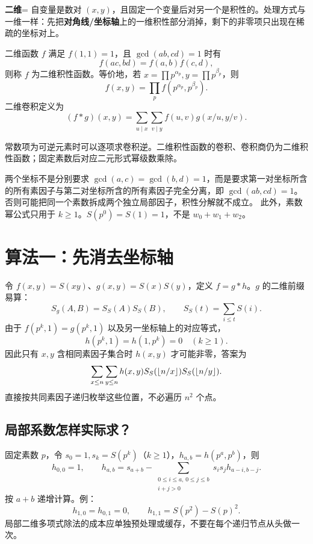 \begin{tip}[词义：二维积性]
\textbf{二维}= 自变量是数对 $(x,y)$，且固定一个变量后对另一个是积性的。处理方式与一维一样：先把\textbf{对角线/坐标轴}上的一维积性部分消掉，剩下的非零项只出现在稀疏的坐标对上。
\end{tip}

\begin{definition}
二维函数 $f$ 满足 $f(1,1)=1$，且 $\gcd(ab,cd)=1$ 时有
\[
 f(ac,bd)=f(a,b)f(c,d),
\]
则称 $f$ 为二维积性函数。等价地，若 $x=\prod p^{\alpha_p},y=\prod p^{\beta_p}$，则
\[
 f(x,y)=\prod_p f(p^{\alpha_p},p^{\beta_p}).
\]
二维卷积定义为
\[
 (f*g)(x,y)=\sum_{u\mid x}\sum_{v\mid y}f(u,v)g(x/u,y/v).
\]
\end{definition}
常数项为可逆元素时可以逐项求卷积逆。二维积性函数的卷积、卷积商仍为二维积性函数；固定素数后对应二元形式幂级数乘除。


\begin{teach}[从一维过渡时必须补上的条件]
两个坐标不是分别要求 $\gcd(a,c)=\gcd(b,d)=1$，而是要求第一对坐标所含的所有素因子与第二对坐标所含的所有素因子完全分离，即 $\gcd(ab,cd)=1$。否则可能把同一个素数拆成两个独立局部因子，积性分解就不成立。
此外，素数幂公式只用于 $k\ge1$。$S(p^0)=S(1)=1$，不是 $w_0+w_1+w_2$。
\end{teach}


\section{算法一：先消去坐标轴}
令 $f(x,y)=S(xy)$、$g(x,y)=S(x)S(y)$，定义 $f=g*h$。$g$ 的二维前缀易算：
\[
 S_g(A,B)=S_S(A)S_S(B),\qquad S_S(t)=\sum_{i\le t}S(i).
\]
由于 $f(p^k,1)=g(p^k,1)$ 以及另一坐标轴上的对应等式，
\[
 h(p^k,1)=h(1,p^k)=0\quad(k\ge1).
\]
因此只有 $x,y$ 含相同素因子集合时 $h(x,y)$ 才可能非零，答案为
\[
 \sum_{x\le n}\sum_{y\le n}h(x,y)
 S_S(\left\lfloor n/x\right\rfloor)S_S(\left\lfloor n/y\right\rfloor).
\]
直接按共同素因子递归枚举这些位置，不必遍历 $n^2$ 个点。


\subsection{局部系数怎样实际求？}
固定素数 $p$，令 $s_0=1,s_k=S(p^k)$（$k\ge1$），$h_{a,b}=h(p^a,p^b)$，则
\[
 h_{0,0}=1,\qquad
 h_{a,b}=s_{a+b}-\sum_{\substack{0\le i\le a,\,0\le j\le b\\i+j>0}}
 s_i s_j h_{a-i,b-j}.
\]
按 $a+b$ 递增计算。例：
\[
 h_{1,0}=h_{0,1}=0,\qquad h_{1,1}=S(p^2)-S(p)^2.
\]
局部二维多项式除法的成本应单独预处理或缓存，不要在每个递归节点从头做一次。

